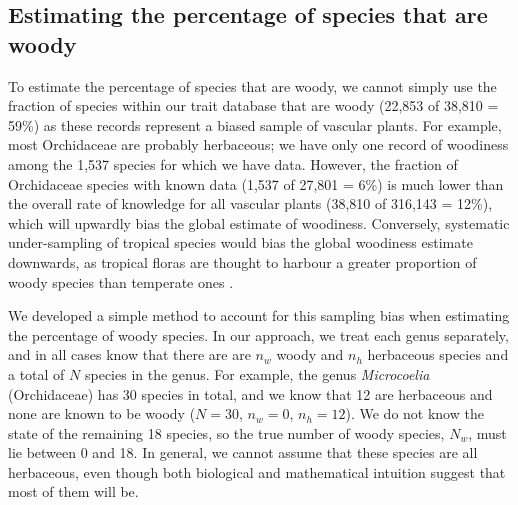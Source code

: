 \subsection{Estimating the percentage of species that are woody}

To estimate the percentage of species that are woody, we cannot simply
use the fraction of species within our trait database that are woody
(22,853 of 38,810 = 59\%) as these records represent a biased sample
of vascular plants.
For example, most Orchidaceae are probably herbaceous; we have only
one record of woodiness among the 1,537 species for which we have
data.
However, the fraction of Orchidaceae species with known data (1,537 of
27,801 = 6\%)
is much lower than the overall rate of knowledge for all vascular
plants (38,810 of 316,143 = 12\%), which will upwardly bias the global
estimate of woodiness.
Conversely, systematic under-sampling of tropical species would bias
the global woodiness estimate downwards, as tropical floras are
thought to harbour a greater proportion of woody species than
temperate ones \citep{Molesheihgt}.

We developed a simple method to account for this sampling bias when
estimating the percentage of woody species.  In our approach, we treat
each genus separately, and in all cases know that there are are $n_w$
woody and $n_h$ herbaceous species and a total of $N$ species in the genus.
%
For example, the genus \textit{Microcoelia} (Orchidaceae) has 30
species in total, and we know that 12 are herbaceous and none are
known to be woody ($N = 30$, $n_w = 0$, $n_h = 12$). We do not know
the state of the remaining 18 species, so the true number of woody
species, $N_w$, must lie between 0 and 18. In general, we cannot
assume that these species are all herbaceous, even though both
biological and mathematical intuition suggest that most of them will
be.

